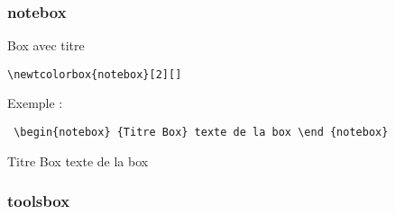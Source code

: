 \subsubsection{notebox}

Box avec titre

\begin{verbatim}
\newtcolorbox{notebox}[2][]
\end{verbatim}

Exemple :  \begin{verbatim}
 \begin{notebox} {Titre Box} texte de la box \end {notebox} 
\end{verbatim}

\begin{notebox}{Titre Box} texte de la box	
\end{notebox}


\subsubsection{toolsbox}




